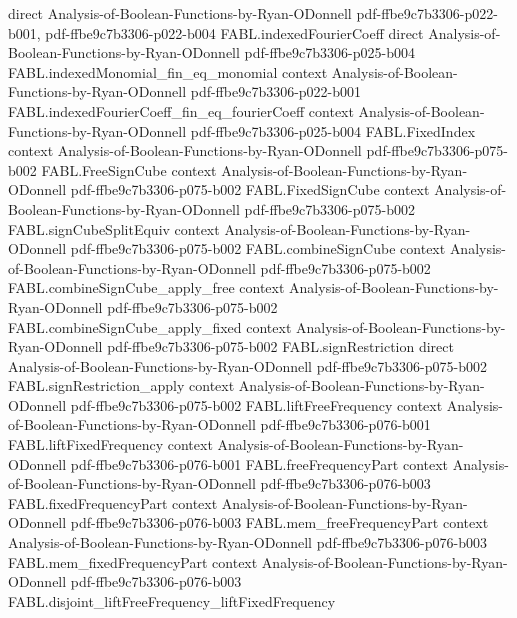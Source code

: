 \begin{theorem}
  {direct}
  {Analysis-of-Boolean-Functions-by-Ryan-ODonnell}
  {pdf-ffbe9c7b3306-p022-b001,
    pdf-ffbe9c7b3306-p022-b004}
\proofstep
  {FABL.indexedFourierCoeff}
  {direct}
  {Analysis-of-Boolean-Functions-by-Ryan-ODonnell}
  {pdf-ffbe9c7b3306-p025-b004}
\proofstep
  {FABL.indexedMonomial_fin_eq_monomial}
  {context}
  {Analysis-of-Boolean-Functions-by-Ryan-ODonnell}
  {pdf-ffbe9c7b3306-p022-b001}
\proofstep
  {FABL.indexedFourierCoeff_fin_eq_fourierCoeff}
  {context}
  {Analysis-of-Boolean-Functions-by-Ryan-ODonnell}
  {pdf-ffbe9c7b3306-p025-b004}
\proofstep
  {FABL.FixedIndex}
  {context}
  {Analysis-of-Boolean-Functions-by-Ryan-ODonnell}
  {pdf-ffbe9c7b3306-p075-b002}
\proofstep
  {FABL.FreeSignCube}
  {context}
  {Analysis-of-Boolean-Functions-by-Ryan-ODonnell}
  {pdf-ffbe9c7b3306-p075-b002}
\proofstep
  {FABL.FixedSignCube}
  {context}
  {Analysis-of-Boolean-Functions-by-Ryan-ODonnell}
  {pdf-ffbe9c7b3306-p075-b002}
\proofstep
  {FABL.signCubeSplitEquiv}
  {context}
  {Analysis-of-Boolean-Functions-by-Ryan-ODonnell}
  {pdf-ffbe9c7b3306-p075-b002}
\proofstep
  {FABL.combineSignCube}
  {context}
  {Analysis-of-Boolean-Functions-by-Ryan-ODonnell}
  {pdf-ffbe9c7b3306-p075-b002}
\proofstep
  {FABL.combineSignCube_apply_free}
  {context}
  {Analysis-of-Boolean-Functions-by-Ryan-ODonnell}
  {pdf-ffbe9c7b3306-p075-b002}
\proofstep
  {FABL.combineSignCube_apply_fixed}
  {context}
  {Analysis-of-Boolean-Functions-by-Ryan-ODonnell}
  {pdf-ffbe9c7b3306-p075-b002}
\proofstep
  {FABL.signRestriction}
  {direct}
  {Analysis-of-Boolean-Functions-by-Ryan-ODonnell}
  {pdf-ffbe9c7b3306-p075-b002}
\proofstep
  {FABL.signRestriction_apply}
  {context}
  {Analysis-of-Boolean-Functions-by-Ryan-ODonnell}
  {pdf-ffbe9c7b3306-p075-b002}
\proofstep
  {FABL.liftFreeFrequency}
  {context}
  {Analysis-of-Boolean-Functions-by-Ryan-ODonnell}
  {pdf-ffbe9c7b3306-p076-b001}
\proofstep
  {FABL.liftFixedFrequency}
  {context}
  {Analysis-of-Boolean-Functions-by-Ryan-ODonnell}
  {pdf-ffbe9c7b3306-p076-b001}
\proofstep
  {FABL.freeFrequencyPart}
  {context}
  {Analysis-of-Boolean-Functions-by-Ryan-ODonnell}
  {pdf-ffbe9c7b3306-p076-b003}
\proofstep
  {FABL.fixedFrequencyPart}
  {context}
  {Analysis-of-Boolean-Functions-by-Ryan-ODonnell}
  {pdf-ffbe9c7b3306-p076-b003}
\proofstep
  {FABL.mem_freeFrequencyPart}
  {context}
  {Analysis-of-Boolean-Functions-by-Ryan-ODonnell}
  {pdf-ffbe9c7b3306-p076-b003}
\proofstep
  {FABL.mem_fixedFrequencyPart}
  {context}
  {Analysis-of-Boolean-Functions-by-Ryan-ODonnell}
  {pdf-ffbe9c7b3306-p076-b003}
\proofstep
  {FABL.disjoint_liftFreeFrequency_liftFixedFrequency}

\end{theorem}
